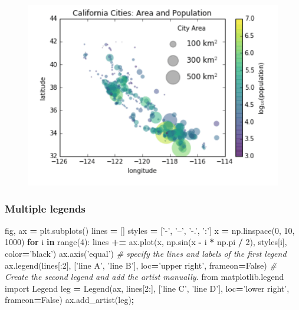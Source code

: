 \documentclass[]{book}
\newenvironment{Shaded}{\begin{snugshade}}{\end{snugshade}}
\newcommand{\KeywordTok}[1]{\textcolor[rgb]{0.13,0.29,0.53}{\textbf{#1}}}
\newcommand{\DecValTok}[1]{\textcolor[rgb]{0.00,0.00,0.81}{#1}}
\newcommand{\StringTok}[1]{\textcolor[rgb]{0.31,0.60,0.02}{#1}}
\newcommand{\ImportTok}[1]{#1}
\newcommand{\CommentTok}[1]{\textcolor[rgb]{0.56,0.35,0.01}{\textit{#1}}}
\newcommand{\VariableTok}[1]{\textcolor[rgb]{0.00,0.00,0.00}{#1}}
\newcommand{\ControlFlowTok}[1]{\textcolor[rgb]{0.13,0.29,0.53}{\textbf{#1}}}
\newcommand{\OperatorTok}[1]{\textcolor[rgb]{0.81,0.36,0.00}{\textbf{#1}}}
\newcommand{\BuiltInTok}[1]{#1}
\newcommand{\NormalTok}[1]{#1}
\theoremstyle{definition}
\theoremstyle{definition}
\theoremstyle{definition}
\theoremstyle{remark}
\begin{document}
\begin{figure}
\centering
\includegraphics{images/legend4.png}
\caption{}
\end{figure}

\subsubsection{Multiple legends}\label{multiple-legends}

\begin{Shaded}
\begin{Highlighting}[]
\NormalTok{fig, ax }\OperatorTok{=}\NormalTok{ plt.subplots()}
\NormalTok{lines }\OperatorTok{=}\NormalTok{ []}
\NormalTok{styles }\OperatorTok{=}\NormalTok{ [}\StringTok{'-'}\NormalTok{, }\StringTok{'--'}\NormalTok{, }\StringTok{'-.'}\NormalTok{, }\StringTok{':'}\NormalTok{]}
\NormalTok{x }\OperatorTok{=}\NormalTok{ np.linspace(}\DecValTok{0}\NormalTok{, }\DecValTok{10}\NormalTok{, }\DecValTok{1000}\NormalTok{)}
\ControlFlowTok{for}\NormalTok{ i }\KeywordTok{in} \BuiltInTok{range}\NormalTok{(}\DecValTok{4}\NormalTok{):}
\NormalTok{    lines }\OperatorTok{+=}\NormalTok{ ax.plot(x, np.sin(x }\OperatorTok{-}\NormalTok{ i }\OperatorTok{*}\NormalTok{ np.pi }\OperatorTok{/} \DecValTok{2}\NormalTok{),}
\NormalTok{                     styles[i], color}\OperatorTok{=}\StringTok{'black'}\NormalTok{)}
\NormalTok{ax.axis(}\StringTok{'equal'}\NormalTok{)}
\CommentTok{# specify the lines and labels of the first legend}
\NormalTok{ax.legend(lines[:}\DecValTok{2}\NormalTok{], [}\StringTok{'line A'}\NormalTok{, }\StringTok{'line B'}\NormalTok{],}
\NormalTok{          loc}\OperatorTok{=}\StringTok{'upper right'}\NormalTok{, frameon}\OperatorTok{=}\VariableTok{False}\NormalTok{)}
\CommentTok{# Create the second legend and add the artist manually.}
\ImportTok{from}\NormalTok{ matplotlib.legend }\ImportTok{import}\NormalTok{ Legend}
\NormalTok{leg }\OperatorTok{=}\NormalTok{ Legend(ax, lines[}\DecValTok{2}\NormalTok{:], [}\StringTok{'line C'}\NormalTok{, }\StringTok{'line D'}\NormalTok{],}
\NormalTok{             loc}\OperatorTok{=}\StringTok{'lower right'}\NormalTok{, frameon}\OperatorTok{=}\VariableTok{False}\NormalTok{)}
\NormalTok{ax.add_artist(leg)}\OperatorTok{;}
\end{Highlighting}
\end{Shaded}
\end{document}
